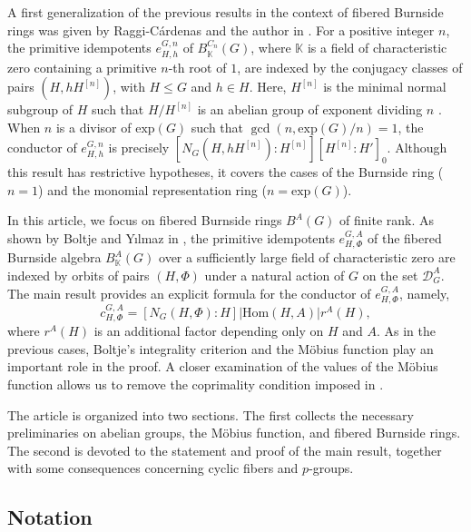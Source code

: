 \documentclass[letterpaper,12pt]{article}
\theoremstyle{plain}
\theoremstyle{definition}
\newcommand{\K}{\mathbb{K}}
\newcommand{\BAG}{B^A(G)}
\newcommand{\BAKG}{B^A_{\mathbb{K}}(G)}
\newcommand{\DAG}{\mathcal{D}^A_G}
\newcommand{\eGAHPhi}{e^{G,A}_{H,\Phi}}
\newcommand{\cGAHPhi}{c^{G,A}_{H,\Phi}}
\newcommand{\eGnHh}{e^{G,n}_{H,h}}
\begin{document}
A first generalization of the previous results in the context of fibered Burnside rings was given by Raggi-Cárdenas and the author in \cite[\S 5]{GarRag}. For a positive integer $n$, the primitive idempotents $e^{G,n}_{H,h}$ of $B^{C_n}_{\K}(G)$, where $\K$ is a field of characteristic zero containing a primitive $n$-th root of $1$, are indexed by the conjugacy classes of pairs $\left(H,hH^{[n]}\right)$, with $H\leq G$ and $h\in H$. Here, $H^{[n]}$ is the minimal normal subgroup of $H$ such that $H/H^{[n]}$ is an abelian group of exponent dividing $n$ \cite[\S 1]{GarRag}. When $n$ is a divisor of $\mathrm{exp}(G)$ such that $\gcd(n,\mathrm{exp}(G)/n)=1$, the conductor of $\eGnHh$ is precisely $\left[N_G\left(H,hH^{[n]}\right):H^{[n]}\right]\left[H^{[n]}:H'\right]_0$. Although this result has restrictive hypotheses, it covers the cases of the Burnside ring ($n=1$) and the monomial representation ring ($n=\mathrm{exp}(G)$).

In this article, we focus on fibered Burnside rings $\BAG$ of finite rank. As shown by Boltje and Y\i lmaz in \cite[\S 3]{BolYil}, the primitive idempotents $\eGAHPhi$ of the fibered Burnside algebra $\BAKG$ over a sufficiently large field of characteristic zero are indexed by orbits of pairs $(H,\Phi)$ under a natural action of $G$ on the set $\DAG$. The main result provides an explicit formula for the conductor of $\eGAHPhi$, namely,
$$\cGAHPhi=\left[N_G(H,\Phi):H\right]\left|\mathrm{Hom}(H,A)\right|r^A(H),$$ 
where $r^A(H)$ is an additional factor depending only on $H$ and $A$. As in the previous cases, Boltje's integrality criterion and the Möbius function play an important role in the proof. A closer examination of the values of the Möbius function allows us to remove the coprimality condition imposed in \cite{GarRag}.

The article is organized into two sections. The first collects the necessary preliminaries on abelian groups, the Möbius function, and fibered Burnside rings. The second is devoted to the statement and proof of the main result, together with some consequences concerning cyclic fibers and $p$-groups.


\subsection*{Notation}
\end{document}
